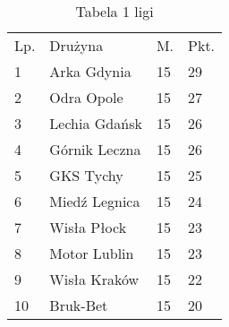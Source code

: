 \begin{table}[htbp]
    \centering
\begin{tabular}{llll}
Lp. & Drużyna       & M. & Pkt. \\
1   & Arka Gdynia   & 15 & 29   \\
2   & Odra Opole    & 15 & 27   \\
3   & Lechia Gdańsk & 15 & 26   \\
4   & Górnik Leczna & 15 & 26   \\
5   & GKS Tychy     & 15 & 25   \\
6   & Miedź Legnica & 15 & 24   \\
7   & Wisła Płock   & 15 & 23   \\
8   & Motor Lublin  & 15 & 23   \\
9   & Wisła Kraków  & 15 & 22   \\
10  & Bruk-Bet      & 15 & 20  
\end{tabular}
    \caption{Tabela 1 ligi}
    \label{tab:XD}
\end{table}
